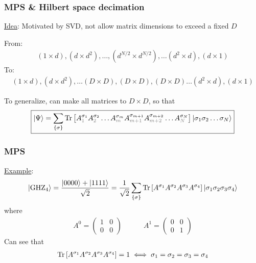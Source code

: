 \documentclass{beamer}
\theoremstyle{definition}
\newcommand{\lb}{\left[}
\newcommand{\rb}{\right]}
\newcommand{\f}[2]{\frac{#1}{#2}}
\begin{document}
\begin{frame}
	\frametitle{MPS \& Hilbert space decimation}
	\underline{Idea}: Motivated by SVD, not allow matrix dimensions to exceed a fixed $D$\\ \pause
	
	\vspace{10pt}
	
	From:
	\begin{align*}
		{(1\times d), (d\times d^2), \dots }, {(d^{N/2}\times d^{N/2})},  {\dots (d^2\times d), (d\times 1)}
	\end{align*}
	To:
	\begin{align*}
		{(1\times d), (d\times d^2), \dots (D\times D)}, {(D \times D)},  { (D\times D)\dots (d^2\times d), (d\times 1)}
	\end{align*}
	
	\vspace{10pt} \pause
	
	To generalize, can make all matrices to $D\times D$, so that
	\begin{align*}
		\boxed{\ket{\Psi} = \sum_{\{\sigma\}}   \Tr\lb  A_{\textcolor{gray}{1}}^{\sigma_1}A_{\textcolor{gray}{2}}^{\sigma_2}\dots A_{\textcolor{gray}{m}}^{\sigma_m}  A_{{\textcolor{gray}{m+1}}}^{\sigma_{m+1}}A_{{\textcolor{gray}{m+2}}}^{\sigma_{m+2}}\dots A_{\textcolor{gray}{N}}^{\sigma_N} \rb  \ket{\sigma_1\sigma_2\dots \sigma_N}}
	\end{align*}
	
	
	
\end{frame}


\begin{frame}
	\frametitle{MPS}
		\underline{Example}: 
	\begin{align*}
		\ket{\text{GHZ}_4} = \f{\ket{0000} + \ket{1111}}{\sqrt{2}}= \f{1}{\sqrt{2}}
		\sum_{\{\sigma\}} \Tr \lb  A^{\sigma_1} A^{\sigma_2} A^{\sigma_3} A^{\sigma_4} \rb \ket{\sigma_1\sigma_2\sigma_3\sigma_4}
	\end{align*}
	where
	\begin{align*}
		A^0 = \begin{pmatrix}
			1 & 0 \\ 0 & 0 
		\end{pmatrix} \quad\quad \quad 
	A^1 = \begin{pmatrix}
		0 & 0 \\ 0 & 1
	\end{pmatrix}
	\end{align*}
	Can see that
	\begin{align*}
		\Tr \lb  A^{\sigma_1} A^{\sigma_2} A^{\sigma_3} A^{\sigma_4} \rb = 1 \iff \sigma_1 = \sigma_2 = \sigma_3 = \sigma_4
	\end{align*}
	
\end{frame}
\end{document}
